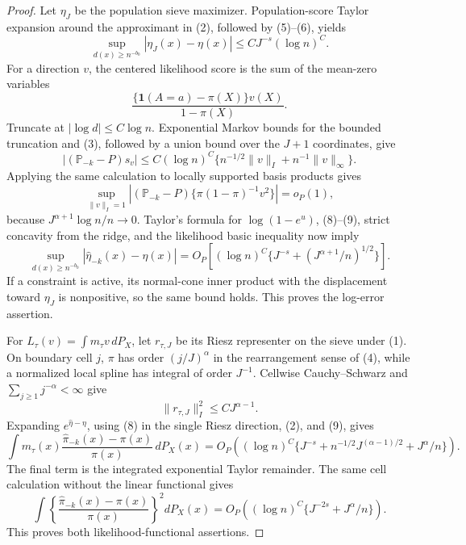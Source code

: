 \documentclass{article}
\begin{document}
\begin{proof}
Let \(\eta_J\) be the population sieve maximizer.  Population-score Taylor expansion around the approximant in (2), followed by (5)--(6), yields
\[
 \sup_{d(x)\ge n^{-b_0}}|\eta_J(x)-\eta(x)|
 \le C J^{-s}(\log n)^C.
\tag{7}
\]
For a direction \(v\), the centered likelihood score is the sum of the mean-zero variables
\[
 \frac{\{\mathbf1(A=a)-\pi(X)\}v(X)}{1-\pi(X)}.
\]
Truncate at \(|\log d|\le C\log n\).  Exponential Markov bounds for the bounded truncation and (3), followed by a union bound over the \(J+1\) coordinates, give
\[
 |(\mathbb P_{-k}-P)s_v|
 \le C(\log n)^C\{n^{-1/2}\|v\|_I+n^{-1}\|v\|_\infty\}.
\tag{8}
\]
Applying the same calculation to locally supported basis products gives
\[
 \sup_{\|v\|_I=1}|(\mathbb P_{-k}-P)\{\pi(1-\pi)^{-1}v^2\}|=o_P(1),
\tag{9}
\]
because \(J^{\alpha+1}\log n/n\to0\).  Taylor's formula for
\(\log(1-e^u)\), (8)--(9), strict concavity from the ridge, and the likelihood basic inequality now imply
\[
 \sup_{d(x)\ge n^{-b_0}}|\widehat\eta_{-k}(x)-\eta(x)|
 =O_P\!\left[(\log n)^C\{J^{-s}+(J^{\alpha+1}/n)^{1/2}\}\right].
\tag{10}
\]
If a constraint is active, its normal-cone inner product with the displacement toward \(\eta_J\) is nonpositive, so the same bound holds.  This proves the log-error assertion.

For \(L_\tau(v)=\int m_\tau v\,dP_X\), let \(r_{\tau,J}\) be its Riesz representer on the sieve under (1).  On boundary cell \(j\), \(\pi\) has order \((j/J)^\alpha\) in the rearrangement sense of (4), while a normalized local spline has integral of order \(J^{-1}\).  Cellwise Cauchy--Schwarz and \(\sum_{j\ge1}j^{-\alpha}<\infty\) give
\[
 \|r_{\tau,J}\|_I^2\le C J^{\alpha-1}.
\tag{11}
\]
Expanding \(e^{\widehat\eta-\eta}\), using (8) in the single Riesz direction, (2), and (9), gives
\[
 \int m_\tau(x)\frac{\widehat\pi_{-k}(x)-\pi(x)}{\pi(x)}\,dP_X(x)
 =O_P\!\left((\log n)^C
 \{J^{-s}+n^{-1/2}J^{(\alpha-1)/2}+J^\alpha/n\}\right).
\tag{12}
\]
The final term is the integrated exponential Taylor remainder.  The same cell calculation without the linear functional gives
\[
 \int\left\{\frac{\widehat\pi_{-k}(x)-\pi(x)}{\pi(x)}\right\}^2dP_X(x)
 =O_P\!\left((\log n)^C\{J^{-2s}+J^\alpha/n\}\right).
\tag{13}
\]
This proves both likelihood-functional assertions.


\end{proof}
\end{document}
